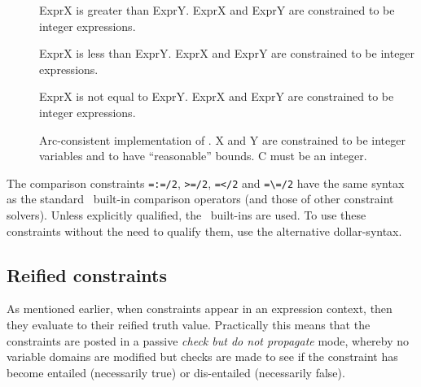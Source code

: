 \begin{description}
\item []
ExprX is greater than ExprY.  ExprX and ExprY are constrained to be integer
expressions.

\item []
ExprX is less than ExprY.  ExprX and ExprY are constrained to be integer
expressions.

\item []
ExprX is not equal to ExprY.  ExprX and ExprY are constrained to be integer
expressions.

\item []
Arc-consistent implementation of .  X and Y are
constrained to be integer variables and to have ``reasonable'' bounds.  C
must be an integer.

\end{description}

The comparison constraints \verb'=:=/2', \verb'>=/2', \verb'=</2' and
\verb'=\=/2' have the same syntax as the standard \eclipse\ built-in
comparison operators (and those of other constraint solvers).
Unless explicitly qualified, the \eclipse\ built-ins are used.
To use these constraints without the need to qualify them, use the
alternative dollar-syntax.
%
%
%


\subsection{Reified constraints}
\label{sec:reified-constraints}
As mentioned earlier, when constraints appear in an expression
context, then they evaluate to their reified truth value.  Practically
this means that the constraints are posted in a passive {\em check but
do not propagate} mode, whereby no variable domains are modified but
checks are made to see if the constraint has become entailed
(necessarily true) or dis-entailed (necessarily false).

